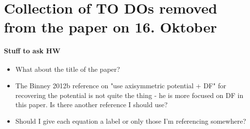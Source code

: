 \section{Collection of TO DOs removed from the paper on 16. Oktober}

\paragraph{Stuff to ask HW}
\begin{itemize}
\item What about the title of the paper?
\item The Binney 2012b reference on "use axisymmetric potential + DF" for recovering the potential is not quite the thing - he is more focused on DF in this paper. Is there another reference I should use?
\item Should I give each equation a label or only those I'm referencing somewhere?
\end{itemize}

